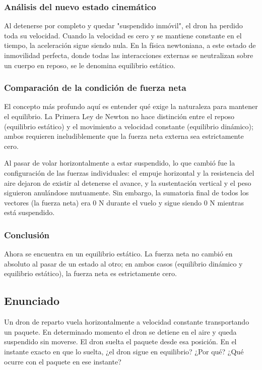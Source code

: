 \documentclass[12pt, a4paper]{article}
\begin{document}
\subsubsection*{Análisis del nuevo estado cinemático}
Al detenerse por completo y quedar "suspendido inmóvil", el dron ha perdido toda su velocidad. Cuando la velocidad es cero y se mantiene constante en el tiempo, la aceleración sigue siendo nula. En la física newtoniana, a este estado de inmovilidad perfecta, donde todas las interacciones externas se neutralizan sobre un cuerpo en reposo, se le denomina equilibrio estático.

\subsubsection*{Comparación de la condición de fuerza neta}
El concepto más profundo aquí es entender qué exige la naturaleza para mantener el equilibrio. La Primera Ley de Newton no hace distinción entre el reposo (equilibrio estático) y el movimiento a velocidad constante (equilibrio dinámico); ambos requieren ineludiblemente que la fuerza neta externa sea estrictamente cero. 

Al pasar de volar horizontalmente a estar suspendido, lo que cambió fue la configuración de las fuerzas individuales: el empuje horizontal y la resistencia del aire dejaron de existir al detenerse el avance, y la sustentación vertical y el peso siguieron anulándose mutuamente. Sin embargo, la sumatoria final de todos los vectores (la fuerza neta) era $0 \text{ N}$ durante el vuelo y sigue siendo $0 \text{ N}$ mientras está suspendido.

\subsubsection*{Conclusión}
Ahora se encuentra en un equilibrio estático. La fuerza neta no cambió en absoluto al pasar de un estado al otro; en ambos casos (equilibrio dinámico y equilibrio estático), la fuerza neta es estrictamente cero.

\newpage
\subsection*{Enunciado}
Un dron de reparto vuela horizontalmente a velocidad constante transportando un paquete. En determinado momento el dron se detiene en el aire y queda suspendido sin moverse. El dron suelta el paquete desde esa posición. En el instante exacto en que lo suelta, ¿el dron sigue en equilibrio? ¿Por qué? ¿Qué ocurre con el paquete en ese instante?
\end{document}
